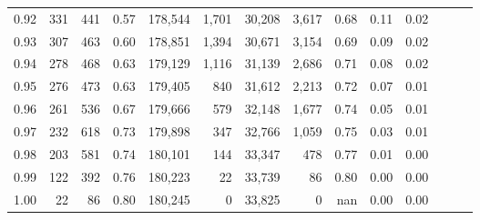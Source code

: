 \begin{tabular}{rrrrrrrrrrrrrr}
0.92 &    331 &  441 &  0.57 &  178,544 &    1,701 &  30,208 &   3,617 &  0.68 &  0.11 &      0.02 \\
0.93 &    307 &  463 &  0.60 &  178,851 &    1,394 &  30,671 &   3,154 &  0.69 &  0.09 &      0.02 \\
0.94 &    278 &  468 &  0.63 &  179,129 &    1,116 &  31,139 &   2,686 &  0.71 &  0.08 &      0.02 \\
0.95 &    276 &  473 &  0.63 &  179,405 &      840 &  31,612 &   2,213 &  0.72 &  0.07 &      0.01 \\
0.96 &    261 &  536 &  0.67 &  179,666 &      579 &  32,148 &   1,677 &  0.74 &  0.05 &      0.01 \\
0.97 &    232 &  618 &  0.73 &  179,898 &      347 &  32,766 &   1,059 &  0.75 &  0.03 &      0.01 \\
0.98 &    203 &  581 &  0.74 &  180,101 &      144 &  33,347 &     478 &  0.77 &  0.01 &      0.00 \\
0.99 &    122 &  392 &  0.76 &  180,223 &       22 &  33,739 &      86 &  0.80 &  0.00 &      0.00 \\
1.00 &     22 &   86 &  0.80 &  180,245 &        0 &  33,825 &       0 &   nan &  0.00 &      0.00 \\
\bottomrule
\end{tabular}
